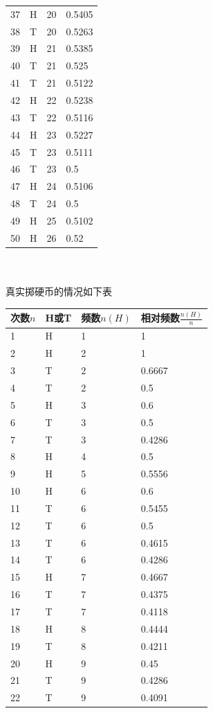 \documentclass{article}
\begin{document}
\begin{CJK}{UTF8}{gbsn}
\begin{tabular}{l|l|l|l}
	37 & H & 20 & 0.5405\\
	38 & T & 20 & 0.5263\\
	39 & H & 21 & 0.5385\\
	40 & T & 21 & 0.525\\
	41 & T & 21 & 0.5122\\
	42 & H & 22 & 0.5238\\
	43 & T & 22 & 0.5116\\
	44 & H & 23 & 0.5227\\
	45 & T & 23 & 0.5111\\
	46 & T & 23 & 0.5\\
	47 & H & 24 & 0.5106\\
	48 & T & 24 & 0.5\\
	49 & H & 25 & 0.5102\\
	50 & H & 26 & 0.52\\
\end{tabular}
\\
\\
真实掷硬币的情况如下表
\\
\begin{tabular}{l|l|l|l}
	次数$n$ & H或T & 频数$n(H)$ & 相对频数$\frac{n(H)}{n}$\\
	\hline
	1 & H & 1 & 1\\
	2 & H & 2 & 1\\
	3 & T & 2 & 0.6667\\
	4 & T & 2 & 0.5\\
	5 & H & 3 & 0.6\\
	6 & T & 3 & 0.5\\
	7 & T & 3 & 0.4286\\
	8 & H & 4 & 0.5\\
	9 & H & 5 & 0.5556\\
	10 & H & 6 & 0.6\\
	11 & T & 6 & 0.5455\\
	12 & T & 6 & 0.5\\
	13 & T & 6 & 0.4615\\
	14 & T & 6 & 0.4286\\
	15 & H & 7 & 0.4667\\
	16 & T & 7 & 0.4375\\
	17 & T & 7 & 0.4118\\
	18 & H & 8 & 0.4444\\
	19 & T & 8 & 0.4211\\
	20 & H & 9 & 0.45\\
	21 & T & 9 & 0.4286\\
	22 & T & 9 & 0.4091\\

\end{tabular}
\end{CJK}
\end{document}

